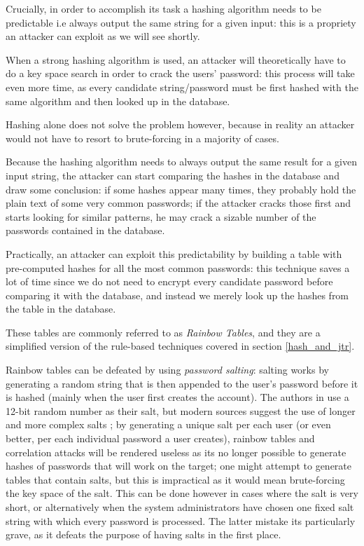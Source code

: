 Crucially, in order to accomplish its task a hashing algorithm needs to be predictable i.e always output the same string for a given input: this is a propriety an attacker can exploit as we will see shortly. 

When a strong hashing algorithm is used, an attacker will theoretically have to do a key space search in order to crack the users' password: this process will take even more time, as every candidate string/password must be first hashed with the same algorithm and then looked up in the database.

Hashing alone does not solve the problem however, because in reality an attacker would not have to resort to brute-forcing in a majority of cases.

Because the hashing algorithm needs to always output the same result for a given input string, the attacker can start comparing the hashes in the database and draw some conclusion: if some hashes appear many times, they probably hold the plain text of some very common passwords; if the attacker cracks those first and starts looking for similar patterns, he may crack a sizable number of the passwords contained in the database.

Practically, an attacker can exploit this predictability by building a table with pre-computed hashes for all the most common passwords: this technique saves a lot of time since we do not need to encrypt every candidate password before comparing it with the database, and instead we merely look up the hashes from the table in the database. 

These tables are commonly referred to as \emph{Rainbow Tables}, and they are a simplified version of the rule-based techniques covered in section \ref{hash_and_jtr}.

Rainbow tables can be defeated by using \emph{password salting}: salting works by generating a random string that is then appended to the user's password before it is hashed (mainly when the user first creates the account). The authors in \cite{Thompson1979} use a 12-bit random number as their salt, but modern sources suggest the use of longer and more complex salts \cite{NIST_2017}; by generating a unique salt per each user (or even better, per each individual password a user creates), rainbow tables and correlation attacks will be rendered useless as its no longer possible to generate hashes of passwords that will work on the target; one might attempt to generate tables that contain salts, but this is impractical as it would mean brute-forcing the key space of the salt.
This can be done however in cases where the salt is very short, or alternatively when the system administrators have chosen one fixed salt string with which every password is processed.
The latter mistake its particularly grave, as it defeats the purpose of having salts in the first place.
   
